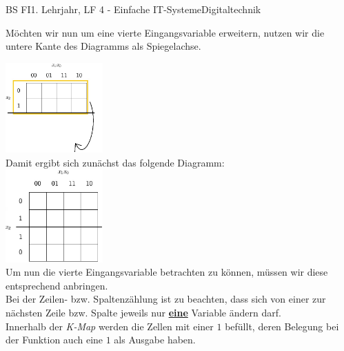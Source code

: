 \documentclass[11pt,twocolumn,oneside,openany,headings=optiontotoc,11pt,numbers=noenddot]{article}
\begin{document}
\begin{worksheet}{BS FI}{1. Lehrjahr, LF 4 - Einfache IT-Systeme}{Digitaltechnik}
\begin{karnaugh-map}[4][2][1][$x_1x_0$][$x_2$]
		\end{karnaugh-map}
		\par\noindent
		Möchten wir nun um eine vierte Eingangsvariable erweitern, nutzen wir die untere Kante des Diagramms als Spiegelachse.\\
		\par\noindent
		\includegraphics[width=0.28\textwidth]{../99_Bilder/190219_2x4zu4x4.jpg}\\
		Damit ergibt sich zunächst das folgende Diagramm:\\
		\includegraphics[width=0.28\textwidth]{../99_Bilder/190219_4x4_3.jpg}\\
		Um nun die vierte Eingangsvariable betrachten zu können, müssen wir diese entsprechend anbringen.\\
		Bei der Zeilen- bzw. Spaltenzählung ist zu beachten, dass sich von einer zur nächsten Zeile bzw. Spalte jeweils nur \underline{\textbf{eine}} Variable ändern darf.\\
		Innerhalb der \textit{K-Map} werden die Zellen mit einer \(1\) befüllt, deren Belegung bei der Funktion auch eine \(1\) als Ausgabe haben.

\end{worksheet}
\end{document}
